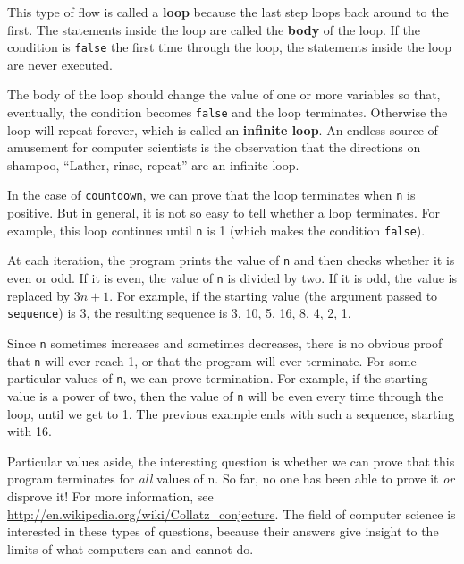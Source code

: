 \documentclass[12pt]{book}
\theoremstyle{exercise}
\newcommand{\java}[1]{\lstinline{#1}} %
\begin{document}

This type of flow is called a {\bf loop} because the last step loops back around to the first.
The statements inside the loop are called the {\bf body} of the loop.
If the condition is \java{false} the first time through the loop, the statements inside the loop are never executed.


The body of the loop should change the value of one or more variables so that, eventually, the condition becomes \java{false} and the loop terminates.
Otherwise the loop will repeat forever, which is called an {\bf infinite loop}.
An endless source of amusement for computer scientists is the observation that the directions on shampoo, ``Lather, rinse, repeat'' are an infinite loop.

In the case of {\tt countdown}, we can prove that the loop terminates when {\tt n} is positive.
But in general, it is not so easy to tell whether a loop terminates.
For example, this loop continues until {\tt n} is 1 (which makes the condition \java{false}).


At each iteration, the program prints the value of {\tt n} and then checks whether it is even or odd.
If it is even, the value of {\tt n} is divided by two.
If it is odd, the value is replaced by $3n+1$.
For example, if the starting value (the argument passed to {\tt sequence}) is 3, the resulting sequence is 3, 10, 5, 16, 8, 4, 2, 1.

Since {\tt n} sometimes increases and sometimes decreases, there is no obvious proof that {\tt n} will ever reach 1, or that the program will ever terminate.
For some particular values of {\tt n}, we can prove termination.
For example, if the starting value is a power of two, then the value of {\tt n} will be even every time through the loop, until
we get to 1.
The previous example ends with such a sequence, starting with 16.

Particular values aside, the interesting question is whether we can prove that this program terminates for {\em all} values of n.
So far, no one has been able to prove it {\em or} disprove it!
For more information, see \url{http://en.wikipedia.org/wiki/Collatz_conjecture}.
The field of computer science is interested in these types of questions, because their answers give insight to the limits of what computers can and cannot do.
\end{document}

